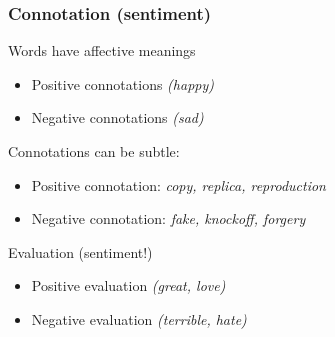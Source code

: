 \documentclass[13.5pt,aspecratio=169, xcolor=dvipsnames]{beamer}
\begin{document}
                        \begin{frame}
                            \onehalfspacing
                                \frametitle{Connotation (sentiment)}
                                {\Large
                                Words have affective meanings
                                \begin{itemize}
                                    \item Positive connotations \textit{(happy)}
                                    \item Negative connotations \textit{(sad)}
                                \end{itemize}
    
                                \bigskip
                                \begin{block}{Connotations can be subtle:}
                                    \begin{itemize}
                                        \item Positive connotation: \textit{copy, replica, reproduction}
                                        \item Negative connotation: \textit{fake, knockoff, forgery}
                                    \end{itemize}
                                \end{block}
    
                                Evaluation (sentiment!)
                                \begin{itemize}
                                    \item Positive evaluation \textit{(great, love)}
                                    \item Negative evaluation \textit{(terrible, hate)}
                                \end{itemize}
                                }
                            \end{frame}
    
\end{document}
